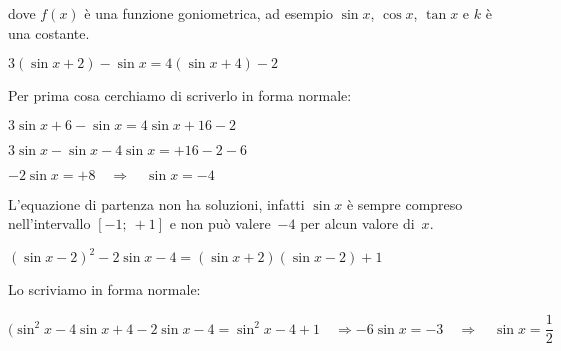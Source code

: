 dove \(f(x)\) è una funzione goniometrica, ad esempio \(\sin x\), \(\cos x\), 
\(\tan x\) e \(k\) è una costante.

 \begin{esempio}
  \(3(\sin x +2) - \sin x = 4 (\sin x +4)-2\)
  
  Per prima cosa cerchiamo di scriverlo in forma normale:
  
  \(3 \sin x +6 - \sin x = 4 \sin x +16-2\)
  
  \(3 \sin x - \sin x - 4 \sin x = +16-2-6 \)
  
  \(- 2 \sin x = +8 \quad \Rightarrow \quad \sin x = -4 \)
  
  L'equazione di partenza non ha soluzioni, infatti \(\sin x\) è sempre 
compreso 
  nell'intervallo \(\left [-1;~+1 \right]\) e non può valere~\(-4\) per alcun 
  valore di~\(x\).
 \end{esempio}

 \begin{esempio}
  \((\sin x -2)^2 - 2 \sin x -4 = (\sin x +2)(\sin x -2)+1\)

  Lo scriviamo in forma normale:

\((\sin^2 x -4 \sin x +4 - 2 \sin x -4 = \sin^2x -4 +1 \quad \Rightarrow
-6 \sin x = -3 \quad \Rightarrow \quad \sin x = \dfrac{1}{2}\)
% 
% 

\end{esempio}


